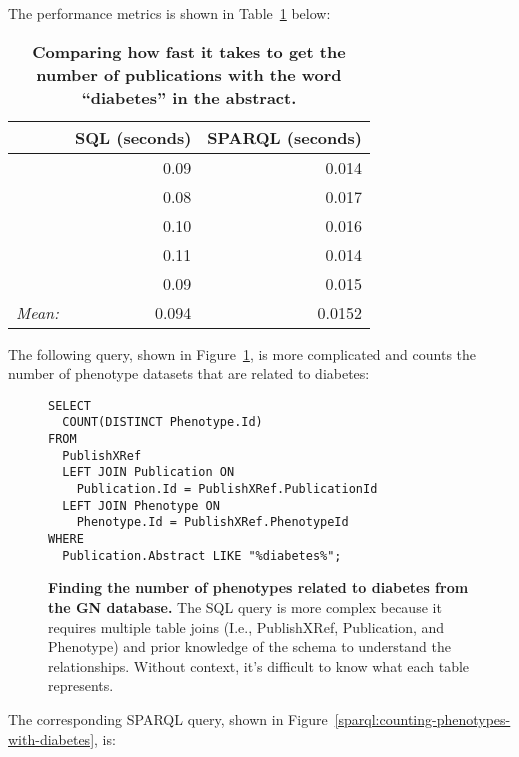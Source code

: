 The performance metrics is shown in Table~\ref{table:perf-1} below:

\begin{table}[H]
\begin{tabular}{r|rr}
& SQL (seconds) & SPARQL (seconds)\\[0pt]
\toprule
& 0.09 & 0.014\\[0pt]
& 0.08 & 0.017\\[0pt]
& 0.10 & 0.016\\[0pt]
& 0.11 & 0.014\\[0pt]
& 0.09 & 0.015\\[0pt]
\toprule
\textit{Mean:} & 0.094 & 0.0152\\[0pt]
\end{tabular}
\caption[Performance comparison in seconds: publication count with "diabetes" (SQL vs SPARQL).]{\textbf{Comparing how fast it takes to get the number of publications with the word ``diabetes'' in the abstract.}}\label{table:perf-1}
\end{table}

The following query, shown in Figure~\ref{sql:counting-phenotypes-with-diabetes}, is more complicated and counts the number of phenotype datasets that are related to diabetes:

\begin{figure}[H]
\centering
\begin{verbatim}
SELECT
  COUNT(DISTINCT Phenotype.Id)
FROM
  PublishXRef
  LEFT JOIN Publication ON
    Publication.Id = PublishXRef.PublicationId 
  LEFT JOIN Phenotype ON
    Phenotype.Id = PublishXRef.PhenotypeId
WHERE
  Publication.Abstract LIKE "%diabetes%";
\end{verbatim}
\caption[SQL Query to count the number of phenotypes with the word ``diabetes'']{\textbf{Finding the number of phenotypes related to diabetes from the GN database.}  The SQL query is more complex because it requires multiple table joins (I.e., PublishXRef, Publication, and Phenotype) and prior knowledge of the schema to understand the relationships.  Without context, it's difficult to know what each table represents.}\label{sql:counting-phenotypes-with-diabetes}
\end{figure}

The corresponding SPARQL query, shown in Figure~\ref{sparql:counting-phenotypes-with-diabetes}, is:

